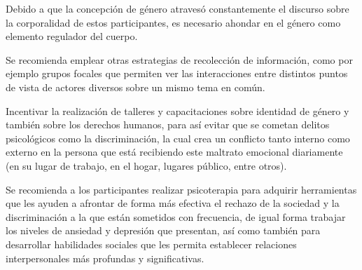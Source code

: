 Debido a que la concepción de género atravesó constantemente el discurso sobre
la corporalidad de estos participantes, es necesario ahondar en el género como
elemento regulador del cuerpo.

Se recomienda emplear otras estrategias de recolección de información, como por
ejemplo grupos focales que permiten ver las interacciones entre distintos puntos
de vista de actores diversos sobre un mismo tema en común.

Incentivar la realización de talleres y capacitaciones sobre identidad de género
y también sobre los derechos humanos, para así evitar que se cometan delitos
psicológicos como la discriminación, la cual crea un conflicto tanto interno
como externo en la persona que está recibiendo este maltrato emocional
diariamente (en su lugar de trabajo, en el hogar, lugares público, entre otros).

Se recomienda a los participantes realizar psicoterapia para adquirir
herramientas que les ayuden a afrontar de forma más efectiva el rechazo de la
sociedad y la discriminación a la que están sometidos con frecuencia, de igual
forma trabajar los niveles de ansiedad y depresión que presentan, así como
también para desarrollar habilidades sociales que les permita establecer
relaciones interpersonales más profundas y significativas.
